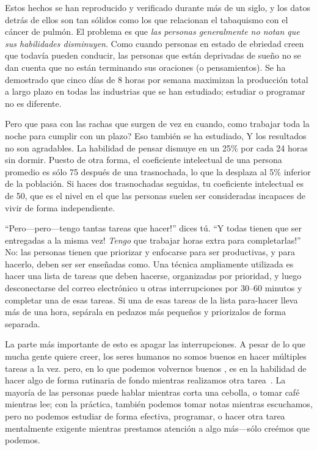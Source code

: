 Estos hechos se han reproducido y verificado durante más de un siglo,
y los datos detrás de ellos son tan sólidos como los que relacionan el tabaquismo con el cáncer de pulmón.
El problema es que
\emph{las personas generalmente no notan que sus habilidades disminuyen}.
Como cuando personas en estado de ebriedad creen que todavía pueden conducir,
las personas que están deprivadas de sueño no se dan cuenta que
no están terminando sus oraciones (o pensamientos).
Se ha demostrado que cinco días de 8 horas por semana maximizan la producción total a largo plazo
en todas las industrias que se han estudiado;
estudiar o programar no es diferente.

Pero que pasa con las rachas que surgen de vez en cuando,
como trabajar toda la noche para cumplir con un plazo?
Eso también se ha estudiado,
Y los resultados no son agradables.
La habilidad de pensar dismuye en un 25\% por cada 24 horas sin dormir.
Puesto de otra forma,
el coeficiente intelectual de una persona promedio es sólo 75 después de una trasnochada,
lo que la desplaza al 5\% inferior de la población.
Si haces dos trasnochadas seguidas, tu coeficiente intelectual es de 50,
que es el nivel en el que las personas suelen ser consideradas incapaces de vivir de forma independiente.

``Pero---pero---tengo tantas tareas que hacer!'' dices tú.
``Y todas tienen que ser entregadas a la misma vez!
\emph{Tengo} que trabajar horas extra para completarlas!''
No:
las personas tienen que priorizar y enfocarse para ser productivas,
y para hacerlo,
deben ser ser enseñadas como.
Una técnica ampliamente utilizada es hacer una lista de tareas que deben hacerse,
organizadas por prioridad,
y luego desconectarse del correo electrónico u otras interrupciones por 30--60 minutos
y completar una de esas tareas.
Si una de esas tareas de la lista para-hacer lleva más de una hora,
sepárala en pedazos más pequeños y priorizalos de forma separada.

La parte más importante de esto es apagar las interrupciones.
A pesar de lo que mucha gente quiere creer,
los seres humanos no somos buenos en hacer múltiples tareas a la vez.
pero, en lo que podemos volvernos buenos ,
es en la habilidad de hacer algo de forma rutinaria de fondo
mientras realizamos otra tarea~\cite{Mill2016a}.
La mayoría de las personas puede hablar mientras corta una cebolla,
o tomar café mientras lee;
con la práctica,
también podemos tomar notas mientras escuchamos,
pero no podemos estudiar de forma efectiva,
programar,
o hacer otra tarea mentalmente exigente mientras prestamos atención a algo más---sólo
creémos que podemos.

